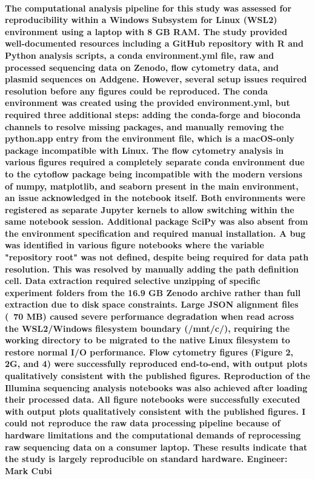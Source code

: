 \documentclass{article}
\begin{document}
\paragraph{
The computational analysis pipeline for this study was assessed for reproducibility within a Windows Subsystem for Linux (WSL2) environment using a laptop with 8 GB RAM. The study provided well-documented resources including a GitHub repository with R and Python analysis scripts, a conda environment.yml file, raw and processed sequencing data on Zenodo, flow cytometry data, and plasmid sequences on Addgene. However, several setup issues required resolution before any figures could be reproduced.
The conda environment was created using the provided environment.yml, but required three additional steps: adding the conda-forge and bioconda channels to resolve missing packages, and manually removing the python.app entry from the environment file, which is a macOS-only package incompatible with Linux. The flow cytometry analysis in various figures required a completely separate conda environment due to the cytoflow package being incompatible with the modern versions of numpy, matplotlib, and seaborn present in the main environment, an issue acknowledged in the notebook itself. Both environments were registered as separate Jupyter kernels to allow switching within the same notebook session. Additional package SciPy was also absent from the environment specification and required manual installation. A bug was identified in various figure notebooks where the variable "repository root" was not defined, despite being required for data path resolution. This was resolved by manually adding the path definition cell.
Data extraction required selective unzipping of specific experiment folders from the 16.9 GB Zenodo archive rather than full extraction due to disk space constraints. Large JSON alignment files (~70 MB) caused severe performance degradation when read across the WSL2/Windows filesystem boundary (/mnt/c/), requiring the working directory to be migrated to the native Linux filesystem to restore normal I/O performance.
Flow cytometry figures (Figure 2, 2G, and 4) were successfully reproduced end-to-end, with output plots qualitatively consistent with the published figures. Reproduction of the Illumina sequencing analysis notebooks was also achieved after loading their processed data. All figure notebooks were successfully executed with output plots qualitatively consistent with the published figures. I could not reproduce the raw data processing pipeline because of hardware limitations and the computational demands of reprocessing raw sequencing data on a consumer laptop. These results indicate that the study is largely reproducible on standard hardware. Engineer: Mark Cubi}
\end{document}
